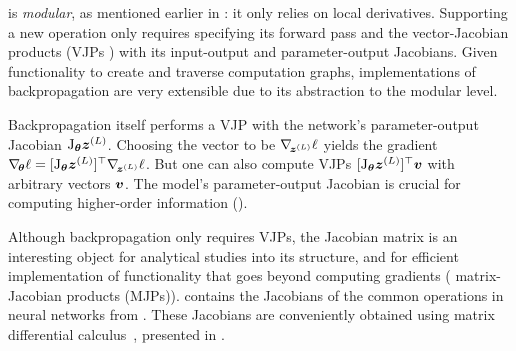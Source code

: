  is \emph{modular}, as mentioned
earlier in : it only relies on local
derivatives. Supporting a new operation only requires specifying its forward
pass and the vector-Jacobian products (VJPs%
) %
with its input-output and parameter-output Jacobians. Given functionality to
create and traverse computation graphs, implementations of backpropagation are
very extensible due to its abstraction to the modular level.

Backpropagation itself performs a VJP with the network's parameter-output
Jacobian $\mathrm{J}_{{\bm{\theta}}} {\bm{z}}^{(L)}$. Choosing the vector to be
$\nabla_{\!{{\bm{z}}^{(L)}}}\ell$ yields the gradient $\nabla_{\!{{\bm{\theta}}}} \ell =
[\mathrm{J}_{{\bm{\theta}}} {\bm{z}}^{(L)}]^{\top} \nabla_{\!{{\bm{z}}^{(L)}}}\ell$. But one can also
compute VJPs $[\mathrm{J}_{{\bm{\theta}}} {\bm{z}}^{(L)}]^{\top} {\bm{v}}$ with arbitrary vectors
${\bm{v}}$. The model's parameter-output Jacobian is crucial for computing
higher-order information ().

Although backpropagation only requires VJPs, the Jacobian matrix is an
interesting object for analytical studies into its structure, and for efficient
implementation of functionality that goes beyond computing gradients (\eg
matrix-Jacobian products (MJPs)).  contains the
Jacobians of the common operations in neural networks from
. These Jacobians are conveniently
obtained using matrix differential
calculus~\cite{magnus1999MatrixDifferentialCalculus}, presented in
.

